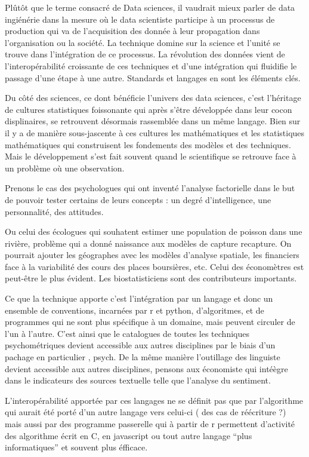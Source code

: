 \documentclass[
]{book}
\begin{document}
Plûtôt que le terme consacré de Data sciences, il vaudrait mieux parler de data ingiénérie dans la mesure où le data scientiste participe à un processus de production qui va de l'acquisition des donnée à leur propagation dans l'organisation ou la société. La technique domine sur la science et l'unité se trouve dans l'intégration de ce processus. La révolution des données vient de l'interopérabilité croissante de ces techniques et d'une intégration qui fluidifie le passage d'une étape à une autre. Standards et langages en sont les éléments clés.

Du côté des sciences, ce dont bénéficie l'univers des data sciences, c'est l'héritage de cultures statistiques foissonante qui après s'être développée dans leur cocon displinaires, se retrouvent désormais rassemblée dans un même langage. Bien sur il y a de manière sous-jascente à ces cultures les mathématiques et les statistiques mathématiques qui construisent les fondements des modèles et des techniques. Mais le développement s'est fait souvent quand le scientifique se retrouve face à un problème où une observation.

Prenons le cas des psychologues qui ont inventé l'analyse factorielle dans le but de pouvoir tester certains de leurs concepts : un degré d'intelligence, une personnalité, des attitudes.

Ou celui des écologues qui souhatent estimer une population de poisson dans une rivière, problème qui a donné naissance aux modèles de capture recapture. On pourrait ajouter les géographes avec les modèles d'analyse spatiale, les financiers face à la variabilité des cours des places boursières, etc. Celui des économètres est peut-être le plus évident. Les biostatisticiens sont des contributeurs importants.

Ce que la technique apporte c'est l'intégration par un langage et donc un ensemble de conventions, incarnées par r et python, d'algoritmes, et de programmes qui ne sont plus spécifique à un domaine, mais peuvent circuler de l'un à l'autre. C'est ainsi que le catalogues de toutes les techniques psychométriques devient accessible aux autres disciplines par le biais d'un pachage en particulier , psych. De la même manière l'outillage des linguiste devient accessible aux autres disciplines, pensons aux économiste qui intéègre dans le indicateurs des sources textuelle telle que l'analyse du sentiment.

L'interopérabilité apportée par ces langages ne se définit pas que par l'algorithme qui aurait été porté d'un autre langage vers celui-ci ( des cas de réécriture ?) mais aussi par des programme passerelle qui à partir de r permettent d'activité des algorithme écrit en C, en javascript ou tout autre langage ``plus informatiques'' et souvent plus éfficace.
\end{document}
